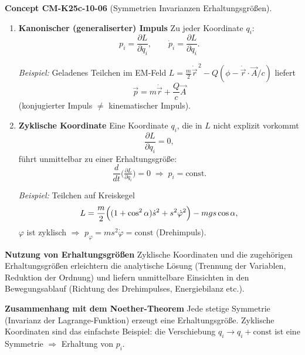\documentclass[10pt, letterpaper]{article}
\newcommand{\CustomHeading}[3]{%
  \par\medskip\noindent%
  \textbf{#1 #2} \textnormal{(#3)}.\enskip%
}
\newenvironment{CONC}[2]{\CustomHeading{Concept}{#1}{#2}}{}
\begin{document}
\begin{CONC}{CM-K25c-10-06}{Symmetrien Invarianzen Erhaltungsgrößen}
\begin{enumerate}
\item \textbf{Kanonischer (generaliserter) Impuls}  
Zu jeder Koordinate $q_i$:
\[
  p_i=\frac{\partial L}{\partial\dot q_i},
  \qquad
  \dot p_i=\frac{\partial L}{\partial q_i}.
\]

\textit{Beispiel:} Geladenes Teilchen im EM-Feld  
$L=\tfrac{m}{2}\dot{\vec r}^{\,2}-Q(\phi-\dot{\vec r}\!\cdot\!\vec A/c)$  
liefert
\[
  \vec p=m\dot{\vec r}+\frac{Q}{c}\vec A
\]
(konjugierter Impuls $\neq$ kinematischer Impuls).

\item \textbf{Zyklische Koordinate}  
Eine Koordinate $q_i$, die in $L$ nicht explizit vorkommt
\[
  \frac{\partial L}{\partial q_i}=0,
\]
führt unmittelbar zu einer Erhaltungsgröße:
\[
  \frac{d}{dt}\bigl(\tfrac{\partial L}{\partial\dot q_i}\bigr)=0
  \;\Longrightarrow\;
  p_i=\text{const}.
\]

\textit{Beispiel:} Teilchen auf Kreiskegel  
\[
  L=\frac{m}{2}
     \Bigl((1+\cos^{2}\alpha)\dot s^{2}+s^{2}\dot\varphi^{2}\Bigr)
     -mg s\cos\alpha,
\]
$\varphi$ ist zyklisch $\Rightarrow$
$p_\varphi=m s^{2}\dot\varphi=\text{const}$ (Drehimpuls).

\end{enumerate}

\textbf{Nutzung von Erhaltungsgrößen}  
Zyklische Koordinaten und die zugehörigen Erhaltungsgrößen erleichtern
die analytische Lösung (Trennung der Variablen, Reduktion der Ordnung)
und liefern unmittelbare Einsichten in den Bewegungsablauf (Richtung
des Drehimpulses, Energiebilanz etc.).

\textbf{Zusammenhang mit dem Noether-Theorem}  
Jede stetige Symmetrie (Invarianz der Lagrange-Funktion) erzeugt eine
Erhaltungsgröße.  
Zyklische Koordinaten sind das einfachste Beispiel: die Verschiebung
$q_i\!\to\!q_i+\text{const}$ ist eine Symmetrie $\Rightarrow$
Erhaltung von $p_i$.
\end{CONC}
\end{document}
